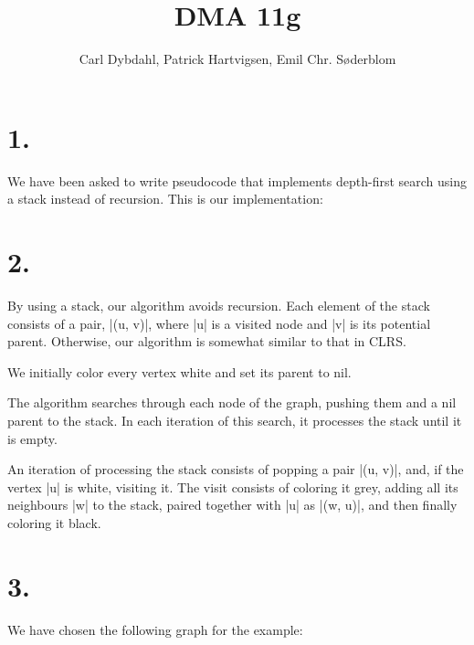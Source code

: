 \documentclass[a4paper]{article}
\title{DMA 11g}
\author{Carl Dybdahl, Patrick Hartvigsen, Emil Chr. Søderblom}
\begin{document}
\maketitle

\section*{1.}

We have been asked to write pseudocode that implements depth-first search using a stack instead of recursion. This is our implementation:


\section*{2.}

By using a stack, our algorithm avoids recursion. Each element of the stack consists of a pair, \code|(u, v)|, where \code|u| is a visited node and \code|v| is its potential parent. Otherwise, our algorithm is somewhat similar to that in CLRS.

We initially color every vertex white and set its parent to nil.

The algorithm searches through each node of the graph, pushing them and a nil parent to the stack. In each iteration of this search, it processes the stack until it is empty.

An iteration of processing the stack consists of popping a pair \code|(u, v)|, and, if the vertex \code|u| is white, visiting it. The visit consists of coloring it grey, adding all its neighbours \code|w| to the stack, paired together with \code|u| as \code|(w, u)|, and then finally coloring it black.

\section*{3.}

We have chosen the following graph for the example:

\newcommand{\examplegraph}[5]{
\tikz {

\fill[#1] (0, 0) circle[radius=0.25]; \node (a) at (0, 0) [circle] { a }; \draw[black] (a) circle[radius=0.25];
\fill[#2] (0, -1) circle[radius=0.25]; \node (b) at (0, -1) [circle] { b }; \draw[black] (b) circle[radius=0.25];
\fill[#3] (1, -1) circle[radius=0.25]; \node (c) at (1, -1) [circle] { c }; \draw[black] (c) circle[radius=0.25];
\draw (a) edge[-] (b) (b) edge[-] (c) (c) edge[-] (a);
\fill[#4] (2, 0) circle[radius=0.25]; \node (d) at (2, 0) [circle] { d }; \draw[black] (d) circle[radius=0.25];
\fill[#5] (2, -1) circle[radius=0.25]; \node (e) at (2, -1) [circle] { e }; \draw[black] (e) circle[radius=0.25];
\draw (d) edge[-] (e);

}
}
\end{document}
